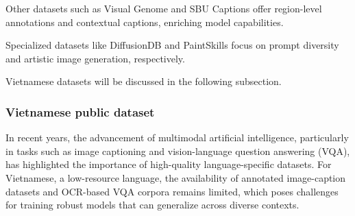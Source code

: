 \documentclass[conference]{IEEEtran}
\begin{document}
Other datasets such as Visual Genome \cite{krishna2017visual} and SBU Captions \cite{ordonez2011im2text} offer region-level annotations and contextual captions, enriching model capabilities.

Specialized datasets like DiffusionDB \cite{wang2022diffusiondb} and PaintSkills \cite{cho2023dallevalprobingreasoningskills} focus on prompt diversity and artistic image generation, respectively.

Vietnamese datasets will be discussed in the following subsection.

\subsubsection{Vietnamese public dataset}
In recent years, the advancement of multimodal artificial intelligence, particularly in tasks such as image captioning and vision-language question answering (VQA), has highlighted the importance of high-quality language-specific datasets. For Vietnamese, a low-resource language, the availability of annotated image-caption datasets and OCR-based VQA corpora remains limited, which poses challenges for training robust models that can generalize across diverse contexts.
\end{document}
